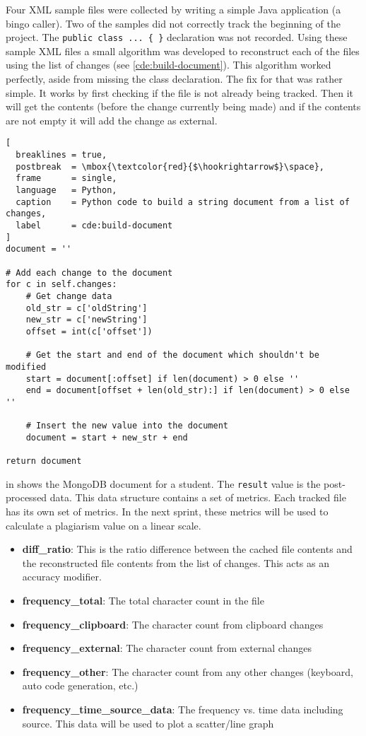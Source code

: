 Four XML sample files were collected by writing a simple Java application (a bingo caller). Two of the samples did not correctly track the beginning of the project. The \texttt{public class ... \{ \}} declaration was not recorded. Using these sample XML files a small algorithm was developed to reconstruct each of the files using the list of changes (see \autoref{cde:build-document}). This algorithm worked perfectly, aside from missing the class declaration. The fix for that was rather simple. It works by first checking if the file is not already being tracked. Then it will get the contents (before the change currently being made) and if the contents are not empty it will add the change as external.

\begin{lstlisting}[
  breaklines = true,
  postbreak  = \mbox{\textcolor{red}{$\hookrightarrow$}\space},
  frame      = single,
  language   = Python,
  caption    = Python code to build a string document from a list of changes,
  label      = cde:build-document
]
document = ''

# Add each change to the document
for c in self.changes:
    # Get change data
    old_str = c['oldString']
    new_str = c['newString']
    offset = int(c['offset'])

    # Get the start and end of the document which shouldn't be modified
    start = document[:offset] if len(document) > 0 else ''
    end = document[offset + len(old_str):] if len(document) > 0 else ''

    # Insert the new value into the document
    document = start + new_str + end

return document
\end{lstlisting}

 in  shows the MongoDB document for a student. The \texttt{result} value is the post-processed data. This data structure contains a set of metrics. Each tracked file has its own set of metrics. In the next sprint, these metrics will be used to calculate a plagiarism value on a linear scale.

\begin{itemize}
\item \textbf{diff\_ratio}: This is the ratio difference between the cached file contents and the reconstructed file contents from the list of changes. This acts as an accuracy modifier.
\item \textbf{frequency\_total}: The total character count in the file
\item \textbf{frequency\_clipboard}: The character count from clipboard changes
\item \textbf{frequency\_external}: The character count from external changes
\item \textbf{frequency\_other}: The character count from any other changes (keyboard, auto code generation, etc.)
\item \textbf{frequency\_time\_source\_data}: The frequency vs. time data including source. This data will be used to plot a scatter/line graph
\end{itemize}

